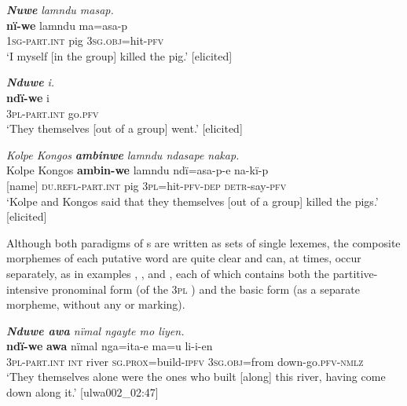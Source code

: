 \ea%
    \label{ex:pron:72}
          \textbf{\textit{Nuwe}} \textit{lamndu masap.}\\
\gll \textbf{nï-we}      lamndu  ma=asa-p\\
    \textsc{1sg-part.int}  pig      \textsc{3sg.obj=}hit-\textsc{pfv}\\
\glt `I myself [in the group] killed the pig.’ [elicited]
\z

\newpage

\ea%
    \label{ex:pron:74}
          \textbf{\textit{Nduwe}} \textit{i.}\\
\gll    \textbf{ndï{}-we}    i\\
    \textsc{3pl-part.int}  go.\textsc{pfv}\\
\glt `They themselves [out of a group] went.’ [elicited]
\z

\ea%
    \label{ex:pron:75}
          \textit{Kolpe Kongos} \textbf{\textit{ambinwe}} \textit{lamndu ndasape nakap.}\\
\gll    Kolpe Kongos    \textbf{ambin-we}      lamndu  ndï=asa-p-e na-kï-p\\
    [name]  [name]  \textsc{du.refl-part.int}  pig      \textsc{3pl}=hit-\textsc{pfv-dep}    \textsc{detr-}say-\textsc{pfv}\\
\glt `Kolpe and Kongos said that they themselves [out of a group] killed the pigs.’ [elicited]
\z

Although both paradigms of s are written as sets of single lexemes, the composite morphemes of each putative word are quite clear and can, at times, occur separately, as in examples , , and , each of which contains both the  partitive-intensive pronominal form (of the 3\textsc{pl} ) and the basic  form (as a separate morpheme, without any  or  marking).

\ea%
    \label{ex:pron:76}
          \textit{\textbf{Nduwe awa} nïmal ngayte mo liyen.}\\
\gll    \textbf{ndï{}-we}      \textbf{awa}  nïmal  nga=ita-e        ma=u li-i-en\\
    3\textsc{pl-part.int}  \textsc{int}    river  \textsc{sg.prox}=build-\textsc{ipfv}  \textsc{3sg.obj=}from    down-go.\textsc{pfv-nmlz}\\
\glt `They themselves alone were the ones who built [along] this river, having come down along it.’ [ulwa002\_02:47]
\z

\newpage

